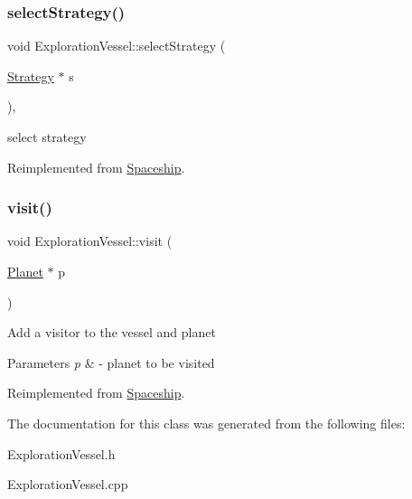 \subsubsection{\texorpdfstring{select\+Strategy()}{selectStrategy()}}
{\footnotesize\ttfamily void Exploration\+Vessel\+::select\+Strategy (\begin{DoxyParamCaption}\item[{\hyperlink{classStrategy}{Strategy} $\ast$}]{s }\end{DoxyParamCaption})\hspace{0.3cm}{\ttfamily [inline]}, {\ttfamily [virtual]}}

select strategy 

Reimplemented from \hyperlink{classSpaceship_a93be2d9d2b675ef978d866d4cd7a6524}{Spaceship}.

\mbox{\label{classExplorationVessel_a31ce2f706dab569719ec91db00ecc49d}} 
\subsubsection{\texorpdfstring{visit()}{visit()}}
{\footnotesize\ttfamily void Exploration\+Vessel\+::visit (\begin{DoxyParamCaption}\item[{\hyperlink{classPlanet}{Planet} $\ast$}]{p }\end{DoxyParamCaption})\hspace{0.3cm}{\ttfamily [virtual]}}

Add a visitor to the vessel and planet 
\begin{DoxyParams}{Parameters}
{\em p} & -\/ planet to be visited \\
\hline
\end{DoxyParams}


Reimplemented from \hyperlink{classSpaceship}{Spaceship}.



The documentation for this class was generated from the following files\+:\begin{DoxyCompactItemize}
\item 
Exploration\+Vessel.\+h\item 
Exploration\+Vessel.\+cpp\end{DoxyCompactItemize}
